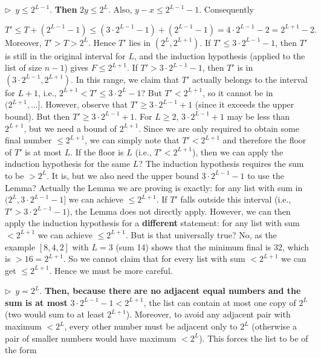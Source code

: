 \documentclass{llmxive}
\providecommand{\compactbullet}[1]{\par\noindent$\triangleright$~#1\par}
\begin{document}
\compactbullet{\textbf{}\(y \le 2^{L-1}\).\textbf{  Then }\(2y \le 2^{L}\).  Also, \(y - x \le 2^{L-1} - 1\).  Consequently}
\[
    T' \le T + (2^{L-1} - 1) \le (3 \cdot 2^{L-1} - 1) + (2^{L-1} - 1) = 4 \cdot 2^{L-1} - 2 = 2^{L+1} - 2.
\]
Moreover, \(T' > T > 2^{L}\). Hence \(T'\) lies in \((2^{L}, 2^{L+1})\). If \(T' \le 3 \cdot 2^{L-1} - 1\), then \(T'\) is still in the original interval for \(L\), and the induction hypothesis (applied to the list of size \(n-1\)) gives \(F \le 2^{L+1}\). If \(T' > 3 \cdot 2^{L-1} - 1\), then \(T'\) is in \((3 \cdot 2^{L-1}, 2^{L+1})\). In this range, we claim that \(T'\) actually belongs to the interval for \(L+1\), i.e., \(2^{L+1} < T' \le 3 \cdot 2^{L} - 1\)? But \(T' < 2^{L+1}\), so it cannot be in \((2^{L+1}, \dots]\). However, observe that \(T' \ge 3 \cdot 2^{L-1} + 1\) (since it exceeds the upper bound). But then \(T' \ge 3 \cdot 2^{L-1} + 1\). For \(L \ge 2\), \(3 \cdot 2^{L-1} + 1\) may be less than \(2^{L+1}\), but we need a bound of \(2^{L+1}\). Since we are only required to obtain some final number \(\le 2^{L+1}\), we can simply note that \(T' < 2^{L+1}\) and therefore the floor of \(T'\) is at most \(L\). If the floor is \(L\) (i.e., \(T' < 2^{L+1}\)), then we can apply the induction hypothesis for the same \(L\)? The induction hypothesis requires the sum to be \(> 2^{L}\). It is, but we also need the upper bound \(3 \cdot 2^{L-1} - 1\) to use the Lemma? Actually the Lemma we are proving is exactly: for any list with sum in \((2^{L}, 3 \cdot 2^{L-1} - 1]\) we can achieve \(\le 2^{L+1}\). If \(T'\) falls outside this interval (i.e., \(T' > 3 \cdot 2^{L-1} - 1\)), the Lemma does not directly apply. However, we can then apply the induction hypothesis for a \textbf{different} statement: for any list with sum \(< 2^{L+1}\) we can achieve \(\le 2^{L+1}\). But is that universally true? No, as the example \([8,4,2]\) with \(L=3\) (sum 14) shows that the minimum final is 32, which is \(> 16 = 2^{L+1}\). So we cannot claim that for every list with sum \(< 2^{L+1}\) we can get \(\le 2^{L+1}\). Hence we must be more careful.\par
\compactbullet{\textbf{}\(y = 2^{L}\).\textbf{  Then, because there are no adjacent equal numbers and the sum is at most }\(3 \cdot 2^{L-1} - 1 < 2^{L+1}\), the list can contain at most one copy of \(2^{L}\) (two would sum to at least \(2^{L+1}\)).  Moreover, to avoid any adjacent pair with maximum \(< 2^{L}\), every other number must be adjacent only to \(2^{L}\) (otherwise a pair of smaller numbers would have maximum \(< 2^{L}\)).  This forces the list to be of the form}
\end{document}
